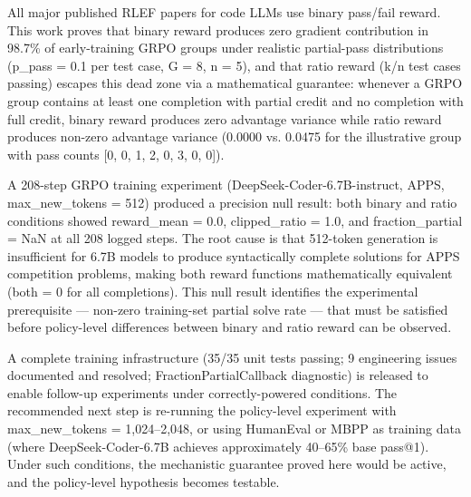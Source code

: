 
All major published RLEF papers for code LLMs use binary pass/fail reward. This work proves that binary reward produces zero gradient contribution in 98.7\% of early-training GRPO groups under realistic partial-pass distributions (p\_pass = 0.1 per test case, G = 8, n = 5), and that ratio reward (k/n test cases passing) escapes this dead zone via a mathematical guarantee: whenever a GRPO group contains at least one completion with partial credit and no completion with full credit, binary reward produces zero advantage variance while ratio reward produces non-zero advantage variance (0.0000 vs. 0.0475 for the illustrative group with pass counts [0, 0, 1, 2, 0, 3, 0, 0]).

A 208-step GRPO training experiment (DeepSeek-Coder-6.7B-instruct, APPS, max\_new\_tokens = 512) produced a precision null result: both binary and ratio conditions showed reward\_mean = 0.0, clipped\_ratio = 1.0, and fraction\_partial = NaN at all 208 logged steps. The root cause is that 512-token generation is insufficient for 6.7B models to produce syntactically complete solutions for APPS competition problems, making both reward functions mathematically equivalent (both = 0 for all completions). This null result identifies the experimental prerequisite --- non-zero training-set partial solve rate --- that must be satisfied before policy-level differences between binary and ratio reward can be observed.

A complete training infrastructure (35/35 unit tests passing; 9 engineering issues documented and resolved; FractionPartialCallback diagnostic) is released to enable follow-up experiments under correctly-powered conditions. The recommended next step is re-running the policy-level experiment with max\_new\_tokens = 1,024--2,048, or using HumanEval or MBPP as training data (where DeepSeek-Coder-6.7B achieves approximately 40--65\% base pass@1). Under such conditions, the mechanistic guarantee proved here would be active, and the policy-level hypothesis becomes testable.

